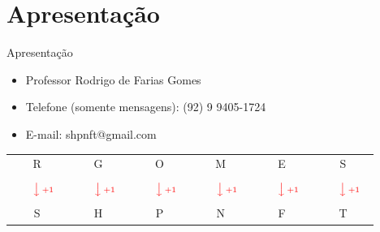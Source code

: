\section{Apresentação}

\begin{frame} %
    \titlepage
\end{frame}

\begin{frame}{Apresentação}
    \begin{itemize}
        \item Professor {\selectfont Rodrigo de Farias Gomes}
        \item Telefone (somente mensagens): (92) 9 9405-1724
        \item E-mail: shpnft@gmail.com

    \end{itemize}

    \centering

    \vspace{2cm}
    \begin{tabular}{cccccc}
        R & G & O & M & E & S \\ \\
        \(\color{red} \left.\phantom{{\scriptstyle +1}\frac{1}{2}}\right\downarrow {\scriptstyle +1}~~\) &
        \(\color{red} \left.\phantom{{\scriptstyle +1}\frac{1}{2}}\right\downarrow {\scriptstyle +1}~~\) &
        \(\color{red} \left.\phantom{{\scriptstyle +1}\frac{1}{2}}\right\downarrow {\scriptstyle +1}~~\) &
        \(\color{red} \left.\phantom{{\scriptstyle +1}\frac{1}{2}}\right\downarrow {\scriptstyle +1}~~\) &
        \(\color{red} \left.\phantom{{\scriptstyle +1}\frac{1}{2}}\right\downarrow {\scriptstyle +1}~~\) &
        \(\color{red} \left.\phantom{{\scriptstyle +1}\frac{1}{2}}\right\downarrow {\scriptstyle +1}~~\) \\ \\
        S & H & P & N & F & T
    \end{tabular}
\end{frame}

